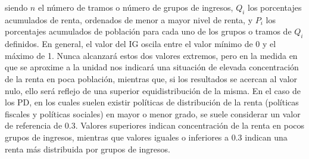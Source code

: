 siendo $n$ el número de tramos o número de grupos de ingresos, $Q_i$ los porcentajes acumulados de renta, ordenados de menor a mayor nivel de renta, y $P_i$ los porcentajes acumulados de población para cada uno de los grupos o tramos de $Q_i$ definidos. En general, el valor del IG oscila entre el valor mínimo de 0 y el máximo de 1. Nunca alcanzará estos dos valores extremos, pero en la medida en que se aproxime a la unidad nos indicará una situación de elevada concentración de la renta en poca población, mientras que, si los resultados se acercan al valor nulo, ello será reflejo de una superior equidistribución de la misma. En el caso de los PD, en los cuales suelen existir políticas de distribución de la renta (políticas fiscales y políticas sociales) en mayor o menor grado, se suele considerar un valor de referencia de $0.3$. Valores superiores indican concentración de la renta en pocos grupos de ingresos, mientras que valores iguales o inferiores a $0.3$ indican una renta más distribuida por grupos de ingresos.

